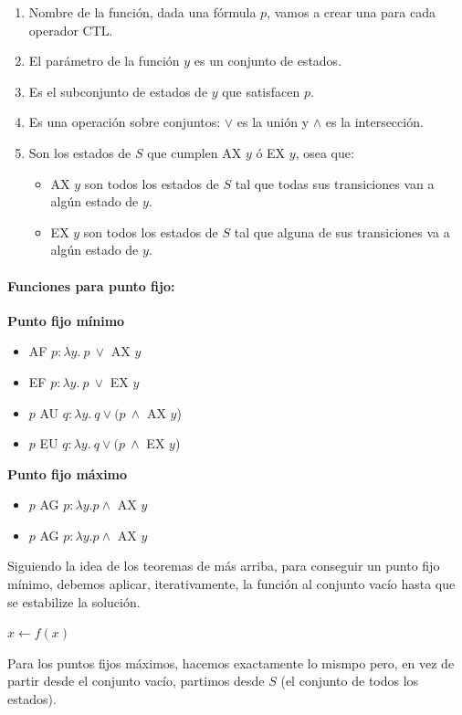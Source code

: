 \begin{enumerate}[label={(}\arabic*{)}]
\item\label{nombre} Nombre de la función, dada una fórmula $p$, vamos a crear una para cada operador CTL.
\item\label{parametro} El parámetro de la función $y$ es un conjunto de estados. 
\item\label{satisfaceP} Es el subconjunto de estados de $y$ que satisfacen $p$. 
\item\label{operacion} Es una operación sobre conjuntos: $\lor$ es la unión y $\land$ es la intersección. 
\item\label{llamada} Son los estados de $S$ que cumplen AX $y$ ó EX $y$, osea que:
\begin{itemize}
\item AX $y$ son todos los estados de $S$ tal que todas sus transiciones van a algún estado de $y$.
\item EX $y$ son todos los estados de $S$ tal que alguna de sus transiciones va a algún estado de $y$.
\end{itemize}
\end{enumerate}

\paragraph{Funciones para punto fijo:}
\begin{itemize}
\begin{multicols}{2}
\item[] \textbf{Punto fijo mínimo}
\begin{itemize}
\item AF $p : \lambda y.~p~\lor$ AX $y$
\item EF $p : \lambda y. ~p~\lor$ EX $y$
\item $p$ AU $q: \lambda y.~ q \lor (p~\land$ AX $y$)
\item $p$ EU $q: \lambda y.~ q \lor (p~\land$ EX $y$)
\end{itemize}
\columnbreak
\item[] \textbf{Punto fijo máximo}
\begin{itemize}
\item $p$ AG $p: \lambda y. p \land$ AX $y$
\item $p$ AG $p: \lambda y. p \land$ AX $y$
\end{itemize}
\vfill\null
\end{multicols}
\end{itemize}

Siguiendo la idea de los teoremas de más arriba, para conseguir un punto fijo mínimo, debemos aplicar, iterativamente, la función al conjunto vacío hasta que se estabilize la solución.
\begin{algorithmic}
    \State $x \leftarrow f(x)$
\EndWhile
\end{algorithmic}
Para los puntos fijos máximos, hacemos exactamente lo mismpo pero, en vez de partir desde el conjunto vacío, partimos desde $S$ (el conjunto de todos los estados).